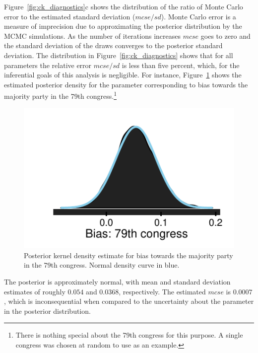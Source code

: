 Figure~{\ref{fig:ck_diagnostics}c} shows the distribution of the ratio of Monte Carlo error to the estimated standard deviation ($mcse/sd$). Monte Carlo error is a measure of imprecision due to approximating the posterior distribution by the MCMC simulations. As the number of iterations increases $mcse$ goes to zero and the standard deviation of the draws converges to the posterior standard deviation. The distribution in Figure~\ref{fig:ck_diagnostics} shows that for all parameters the relative error $mcse/sd$ is less than five percent, which, for the inferential goals of this analysis is negligible. For instance, Figure~\ref{fig:ck_example_posterior} shows the estimated posterior density for the parameter corresponding to bias towards the majority party in the 79th congress.\footnote{There is nothing special about the 79th congress for this purpose. A single congress was chosen at random to use as an example.} 
%
\begin{figure}[h]
\centering
	\includegraphics[scale=0.75]{sections/figs/example_posterior}
\caption{Posterior kernel density estimate for bias towards the majority party in the 79th congress. Normal density curve in blue.}
\label{fig:ck_example_posterior}
\end{figure}
%
\noindent The posterior is approximately normal, with mean and standard deviation estimates of roughly $0.054$ and $0.0368$, respectively. The estimated $mcse$ is $0.0007$, which is inconsequential when compared to the uncertainty about the parameter in the posterior distribution.   


